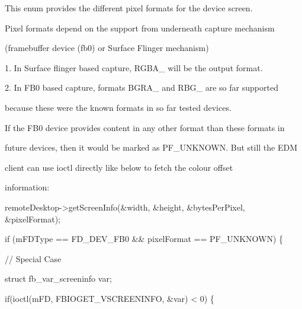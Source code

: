 \-This enum provides the different pixel formats for the device screen. 

\-Pixel formats depend on the support from underneath capture mechanism

(framebuffer device (fb0) or \-Surface \-Flinger mechanism)\par
\par


1. \-In \-Surface flinger based capture, \-R\-G\-B\-A\-\_ will be the output format.\par
\par


2. \-In \-F\-B0 based capture, formats \-B\-G\-R\-A\-\_ and \-R\-B\-G\-\_ are so far supported

because these were the known formats in so far tested devices.

\-If the \-F\-B0 device provides content in any other format than these formats in

future devices, then it would be marked as \-P\-F\-\_\-\-U\-N\-K\-N\-O\-W\-N. \-But still the \-E\-D\-M

client can use ioctl directly like below to fetch the colour offset

information\-:\par



\begin{DoxyPre}\end{DoxyPre}



\begin{DoxyPre}	    remoteDesktop->getScreenInfo(&width, &height, &bytesPerPixel, &pixelFormat);\end{DoxyPre}



\begin{DoxyPre}		if (mFDType == FD\_DEV\_FB0 \&\& pixelFormat == PF\_UNKNOWN) \{\end{DoxyPre}



\begin{DoxyPre}			// Special Case\end{DoxyPre}



\begin{DoxyPre}			struct fb\_var\_screeninfo var;\end{DoxyPre}



\begin{DoxyPre}			if(ioctl(mFD, FBIOGET\_VSCREENINFO, &var) < 0) \{\end{DoxyPre}



